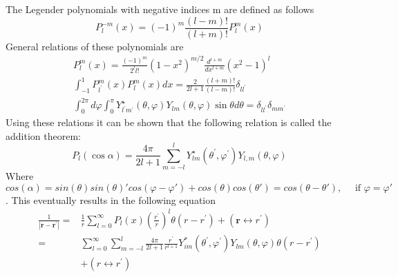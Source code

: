 The Legender polynomials with negative indices m are defined as follows
\begin{equation}
    P_l^{-m}(x) = (-1)^m \frac{(l-m)!}{(l+m)!}P^m_l(x)
\end{equation}
General relations of these polynomials are
\begin{equation}
    \begin{aligned}
    P_{l}^{m}(x)=\frac{(-1)^{m}}{2^{l} l !}\left(1-x^{2}\right)^{m / 2} \frac{d^{l+m}}{d x^{l+m}}\left(x^{2}-1\right)^{l} \\
    \int_{-1}^{1} P_{l^{\prime}}^{m}(x) P_{l}^{m}(x) d x=\frac{2}{2 l+1} \frac{(l+m) !}{(l-m) !} \delta_{l l^{\prime}} \\
    \int_{0}^{2 \pi} d \varphi \int_{0}^{\pi} Y_{l^{\prime} m^{\prime}}^{\star}(\theta, \varphi) Y_{l m}(\theta, \varphi) \sin \theta d \theta=\delta_{l l^{\prime}} \delta_{m m^{\prime}}
    \end{aligned}
\end{equation}
Using these relations it can be shown that the following relation is called the addition theorem:
\begin{equation}
    P_{l}(\cos \alpha)=\frac{4 \pi}{2 l+1} \sum_{m=-l}^{l} Y_{l m}^{\star}\left(\theta^{\prime}, \varphi^{\prime}\right) Y_{l, m}(\theta, \varphi)
\end{equation}
Where $cos(\alpha)=sin(\theta)sin(\theta)'cos(\varphi-\varphi')+cos(\theta)cos(\theta') = cos(\theta-\theta'), \quad\text{ if } \varphi = \varphi'$. This eventually results in the following equation\begin{equation}
    \begin{aligned}
    \frac{1}{\left|\boldsymbol{r}-\boldsymbol{r}^{\prime}\right|}=& \frac{1}{r} \sum_{l=0}^{\infty} P_{l}(x)\left(\frac{r^{\prime}}{r}\right)^{l} \theta\left(r-r^{\prime}\right)+\left(\boldsymbol{r} \leftrightarrow r^{\prime}\right) \\
    =& \sum_{l=0}^{\infty} \sum_{m=-l}^{l} \frac{4 \pi}{2 l+1} \frac{r^{\prime}}{r^{l+1}} Y_{i m}^{*}\left(\theta^{\prime}, \varphi^{\prime}\right) Y_{l m}(\theta, \varphi) \theta\left(r-r^{\prime}\right) \\
    &+\left(r \leftrightarrow r^{\prime}\right)
    \end{aligned}
    \end{equation}
